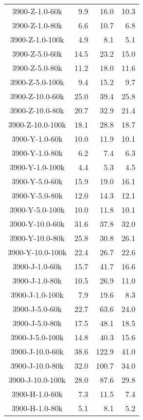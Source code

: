\begin{longtable}{crrr}
    3900-Z-1.0-60k   &    9.9 &   16.0 &   10.3 \\
    3900-Z-1.0-80k   &    6.6 &   10.7 &    6.8 \\
    3900-Z-1.0-100k  &    4.9 &    8.1 &    5.1 \\
    3900-Z-5.0-60k   &   14.5 &   23.2 &   15.0 \\
    3900-Z-5.0-80k   &   11.2 &   18.0 &   11.6 \\
    3900-Z-5.0-100k  &    9.4 &   15.2 &    9.7 \\
    3900-Z-10.0-60k  &   25.0 &   39.4 &   25.8 \\
    3900-Z-10.0-80k  &   20.7 &   32.9 &   21.4 \\
    3900-Z-10.0-100k &   18.1 &   28.8 &   18.7 \\
    3900-Y-1.0-60k   &   10.0 &   11.9 &   10.1 \\
    3900-Y-1.0-80k   &    6.2 &    7.4 &    6.3 \\
    3900-Y-1.0-100k  &    4.4 &    5.3 &    4.5 \\
    3900-Y-5.0-60k   &   15.9 &   19.0 &   16.1 \\
    3900-Y-5.0-80k   &   12.0 &   14.3 &   12.1 \\
    3900-Y-5.0-100k  &   10.0 &   11.8 &   10.1 \\
    3900-Y-10.0-60k  &   31.6 &   37.8 &   32.0 \\
    3900-Y-10.0-80k  &   25.8 &   30.8 &   26.1 \\
    3900-Y-10.0-100k &   22.4 &   26.7 &   22.6 \\
    3900-J-1.0-60k   &   15.7 &   41.7 &   16.6 \\
    3900-J-1.0-80k   &   10.5 &   26.9 &   11.0 \\
    3900-J-1.0-100k  &    7.9 &   19.6 &    8.3 \\
    3900-J-5.0-60k   &   22.7 &   63.6 &   24.0 \\
    3900-J-5.0-80k   &   17.5 &   48.1 &   18.5 \\
    3900-J-5.0-100k  &   14.8 &   40.3 &   15.6 \\
    3900-J-10.0-60k  &   38.6 &  122.9 &   41.0 \\
    3900-J-10.0-80k  &   32.0 &  100.7 &   34.0 \\
    3900-J-10.0-100k &   28.0 &   87.6 &   29.8 \\
    3900-H-1.0-60k   &    7.3 &   11.5 &    7.4 \\
    3900-H-1.0-80k   &    5.1 &    8.1 &    5.2 \\

\end{longtable}
